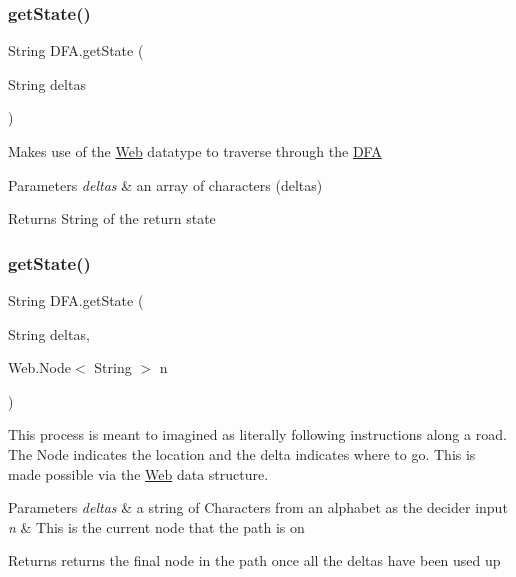 \subsubsection{\texorpdfstring{getState()}{getState()}\hspace{0.1cm}{\footnotesize\ttfamily [1/2]}}
{\footnotesize\ttfamily String D\+F\+A.\+get\+State (\begin{DoxyParamCaption}\item[{String}]{deltas }\end{DoxyParamCaption})\hspace{0.3cm}{\ttfamily [inline]}}

Makes use of the \mbox{\hyperlink{class_web}{Web}} datatype to traverse through the \mbox{\hyperlink{class_d_f_a}{D\+FA}} 
\begin{DoxyParams}{Parameters}
{\em deltas} & an array of characters (deltas) \\
\hline
\end{DoxyParams}
\begin{DoxyReturn}{Returns}
String of the return state 
\end{DoxyReturn}
\mbox{\label{class_d_f_a_a3ed33d3f6ca27d723d8357c0aa44b362}} 
\subsubsection{\texorpdfstring{getState()}{getState()}\hspace{0.1cm}{\footnotesize\ttfamily [2/2]}}
{\footnotesize\ttfamily String D\+F\+A.\+get\+State (\begin{DoxyParamCaption}\item[{String}]{deltas,  }\item[{Web.\+Node$<$ String $>$}]{n }\end{DoxyParamCaption})\hspace{0.3cm}{\ttfamily [inline]}}

This process is meant to imagined as literally following instructions along a road. The Node indicates the location and the delta indicates where to go. This is made possible via the \mbox{\hyperlink{class_web}{Web}} data structure. 
\begin{DoxyParams}{Parameters}
{\em deltas} & a string of Characters from an alphabet as the decider input \\
\hline
{\em n} & This is the current node that the path is on \\
\hline
\end{DoxyParams}
\begin{DoxyReturn}{Returns}
returns the final node in the path once all the deltas have been used up 
\end{DoxyReturn}
\mbox{\label{class_d_f_a_abdddbd2717851483dfe7524f58a9487d}} 
